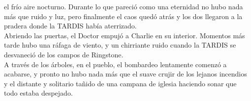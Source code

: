 el frío aire nocturno. Durante lo que pareció como una eternidad no hubo
nada más que ruido y luz, pero finalmente el caos quedó atrás y los dos
llegaron a la pradera donde la TARDIS había aterrizado.\\
Abriendo las puertas, el Doctor empujó a Charlie en su interior.
Momentos más tarde hubo una ráfaga de viento, y un chirriante ruido
cuando la TARDIS se desvaneció de los campos de Ringstone.\\
A través de los árboles, en el pueblo, el bombardeo lentamente comenzó a
acabarse, y pronto no hubo nada más que el suave crujir de los lejanos
incendios y el distante y solitario tañido de una campana de iglesia
haciendo sonar que todo estaba despejado.\\
